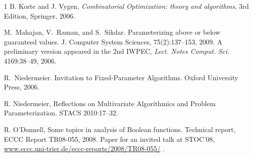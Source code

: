 \documentclass{llncs}
\begin{document}
\begin{thebibliography}{1}
 B. Korte and J. Vygen, {\em Combinatorial Optimization: theory and algorithms}, 3rd Edition, Springer, 2006.

M.~Mahajan, V.~Raman, and S.~Sikdar.
Parameterizing above or below guaranteed values.
J. Computer System Sciences, 75(2):137--153, 2009. A preliminary version appeared in the 2nd IWPEC,
{\em Lect. Notes Comput.
Sci.} 4169:38--49, 2006.

R.~Niedermeier.
Invitation to Fixed-Parameter Algorithms.
Oxford University Press, 2006.

 R. Niedermeier, Reflections on Multivariate Algorithmics and Problem Parameterization.
{STACS 2010}:17--32.

 R. O'Donnell, Some topics in analysis of Boolean functions. Technical report, ECCC Report
TR08-055, 2008. Paper for an invited talk at STOC'08, \url{www.eccc.uni-trier.de/eccc-reports/2008/TR08-055/} .


\end{thebibliography}
\end{document}
